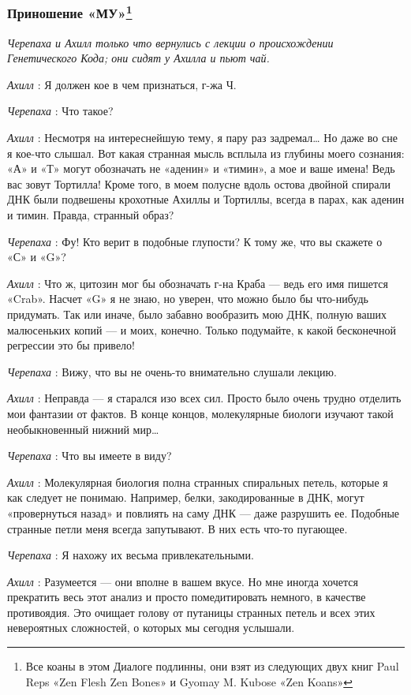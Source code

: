 \subsubsection[Приношение «МУ»]{\texorpdfstring{Приношение «МУ»\footnote{Все коаны в этом Диалоге подлинны, они взят из следующих двух книг Paul Reps «Zen Flesh Zen Bones» и Gyomay M. Kubose «Zen Koans»}}{Приношение «МУ»}}

\emph{Черепаха и Ахилл только что вернулись с лекции о происхождении Генетического Кода; они сидят у Ахилла и пьют чай.}

\emph{Ахилл} : Я должен кое в чем признаться, г-жа Ч.

\emph{Черепаха} : Что такое?

\emph{Ахилл} : Несмотря на интереснейшую тему, я пару раз задремал\ldots{} Но даже во сне я кое-что слышал. Вот какая странная мысль всплыла из глубины моего сознания: «А» и «Т» могут обозначать не «аденин» и «тимин», а мое и ваше имена! Ведь вас зовут Тортилла! Кроме того, в моем полусне вдоль остова двойной спирали ДНК были подвешены крохотные Ахиллы и Тортиллы, всегда в парах, как аденин и тимин. Правда, странный образ?

\emph{Черепаха} : Фу! Кто верит в подобные глупости? К тому же, что вы скажете о «С» и «G»?

\emph{Ахилл} : Что ж, цитозин мог бы обозначать г-на Краба --- ведь его имя пишется «Crab». Насчет «G» я не знаю, но уверен, что можно было бы что-нибудь придумать. Так или иначе, было забавно вообразить мою ДНК, полную ваших малюсеньких копий --- и моих, конечно. Только подумайте, к какой бесконечной регрессии это бы привело!

\emph{Черепаха} : Вижу, что вы не очень-то внимательно слушали лекцию.

\emph{Ахилл} : Неправда --- я старался изо всех сил. Просто было очень трудно отделить мои фантазии от фактов. В конце концов, молекулярные биологи изучают такой необыкновенный нижний мир\ldots{}

\emph{Черепаха} : Что вы имеете в виду?

\emph{Ахилл} : Молекулярная биология полна странных спиральных петель, которые я как следует не понимаю. Например, белки, закодированные в ДНК, могут «провернуться назад» и повлиять на саму ДНК --- даже разрушить ее. Подобные странные петли меня всегда запутывают. В них есть что-то пугающее.

\emph{Черепаха} : Я нахожу их весьма привлекательными.

\emph{Ахилл} : Разумеется --- они вполне в вашем вкусе. Но мне иногда хочется прекратить весь этот анализ и просто помедитировать немного, в качестве противоядия. Это очищает голову от путаницы странных петель и всех этих невероятных сложностей, о которых мы сегодня услышали.

